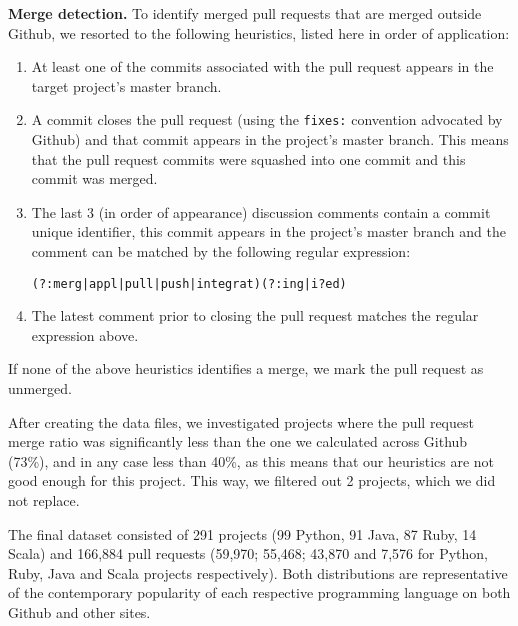 \documentclass{sig-alternate}
\begin{document}
\textbf{Merge detection.} To
identify merged pull requests that are merged outside Github, we resorted to the following heuristics, listed here in order of application:

\begin{enumerate}

  \item At least one of the commits associated with the pull request appears in
    the target project's master branch. 

  \item A commit closes the pull request (using the \texttt{fixes:} convention
    advocated by Github) and that commit appears in the project's master branch.
    This means that the pull request commits were squashed into one commit and
    this commit was merged.

  \item The last 3 (in order of appearance) discussion comments contain
    a commit unique identifier, this commit appears in the
    project's master branch and the comment can be matched by the following 
    regular expression:

    \begin{small}
    \texttt{(?:merg|appl|pull|push|integrat)(?:ing|i?ed)}
    \end{small}
  \item The latest comment prior to closing the pull request matches the 
    regular expression above.

\end{enumerate}

If none of the above heuristics identifies a merge, we mark the pull request
as unmerged. 

After creating the data files, we investigated projects where the pull request
merge ratio was significantly less than the one we calculated across Github
(73\%), and in any case less than 40\%, as this means that our heuristics are not
good enough for this project. This way, we filtered out 2 projects, which we did not
replace.

The final dataset consisted of 291 projects (99 Python, 91 Java, 87 Ruby, 14
Scala) and 166,884 pull requests (59,970; 55,468; 43,870 and 7,576 for Python,
Ruby, Java and Scala projects respectively). Both distributions are
representative of the contemporary popularity of each respective programming
language on both Github and other sites.

%
\end{document}
